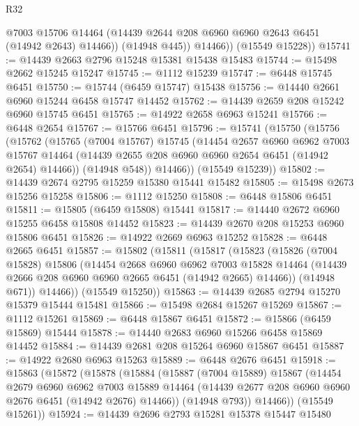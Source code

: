 \begin{lexlean}{R32}
\begin{coremodule}
              @7003
              @15706
              @14464
              (@14439 @2644 @208 @6960 @6960 @2643 @6451 (@14942 @2643) @14466))
            (@14948 @445))
          @14466))
      (@15549 @15228))
@15741 := @14439 @2663 @2796 @15248 @15381 @15438 @15483
@15744 := @15498 @2662 @15245 @15247
@15745 := @1112 @15239
@15747 := @6448 @15745 @6451
@15750 := @15744 (@6459 @15747) @15438
@15756 := @14440 @2661 @6960 @15244 @6458 @15747 @14452
@15762 := @14439 @2659 @208 @15242 @6960 @15745 @6451
@15765 := @14922 @2658 @6963 @15241
@15766 := @6448 @2654
@15767 := @15766 @6451
@15796 := @15741
    (@15750
      (@15756
        (@15762
          (@15765
            (@7004 @15767)
            @15745
            (@14454
              @2657
              @6960
              @6962
              @7003
              @15767
              @14464
              (@14439 @2655 @208 @6960 @6960 @2654 @6451 (@14942 @2654) @14466))
            (@14948 @548))
          @14466))
      (@15549 @15239))
@15802 := @14439 @2674 @2795 @15259 @15380 @15441 @15482
@15805 := @15498 @2673 @15256 @15258
@15806 := @1112 @15250
@15808 := @6448 @15806 @6451
@15811 := @15805 (@6459 @15808) @15441
@15817 := @14440 @2672 @6960 @15255 @6458 @15808 @14452
@15823 := @14439 @2670 @208 @15253 @6960 @15806 @6451
@15826 := @14922 @2669 @6963 @15252
@15828 := @6448 @2665 @6451
@15857 := @15802
    (@15811
      (@15817
        (@15823
          (@15826
            (@7004 @15828)
            @15806
            (@14454
              @2668
              @6960
              @6962
              @7003
              @15828
              @14464
              (@14439 @2666 @208 @6960 @6960 @2665 @6451 (@14942 @2665) @14466))
            (@14948 @671))
          @14466))
      (@15549 @15250))
@15863 := @14439 @2685 @2794 @15270 @15379 @15444 @15481
@15866 := @15498 @2684 @15267 @15269
@15867 := @1112 @15261
@15869 := @6448 @15867 @6451
@15872 := @15866 (@6459 @15869) @15444
@15878 := @14440 @2683 @6960 @15266 @6458 @15869 @14452
@15884 := @14439 @2681 @208 @15264 @6960 @15867 @6451
@15887 := @14922 @2680 @6963 @15263
@15889 := @6448 @2676 @6451
@15918 := @15863
    (@15872
      (@15878
        (@15884
          (@15887
            (@7004 @15889)
            @15867
            (@14454
              @2679
              @6960
              @6962
              @7003
              @15889
              @14464
              (@14439 @2677 @208 @6960 @6960 @2676 @6451 (@14942 @2676) @14466))
            (@14948 @793))
          @14466))
      (@15549 @15261))
@15924 := @14439 @2696 @2793 @15281 @15378 @15447 @15480

\end{coremodule}
\end{lexlean}
